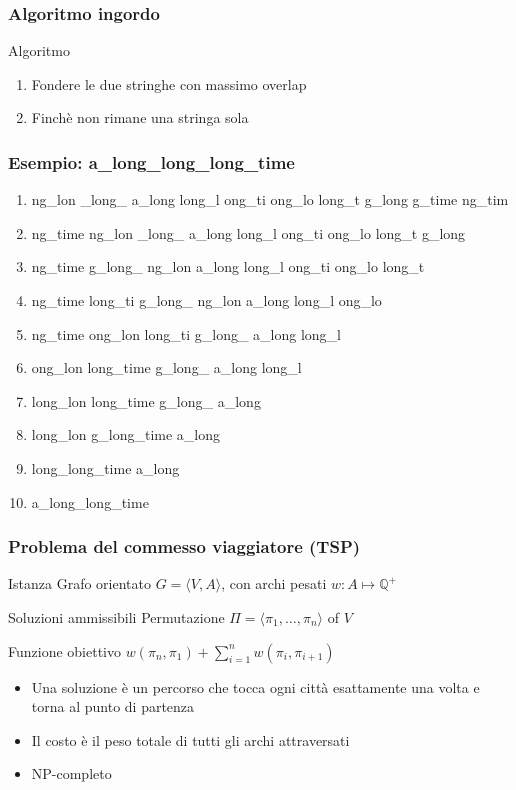 \begin{frame}[fragile]
\frametitle{Algoritmo ingordo}
\begin{block}{Algoritmo}
\begin{enumerate}
\item
Fondere le due stringhe con massimo overlap
\item
Finchè non rimane una stringa sola
\end{enumerate}
\end{block}
\end{frame}

\begin{frame}[fragile]
\frametitle{Esempio: a\_long\_long\_long\_time}
\begin{enumerate}
\item
ng\_lon \_long\_ a\_long long\_l ong\_ti ong\_lo long\_t g\_long
\alert{g\_time ng\_tim}
\item
  ng\_time ng\_lon
\alert{\_long\_}
 a\_long long\_l ong\_ti ong\_lo long\_t
\alert{g\_long}
\item
  ng\_time g\_long\_ ng\_lon a\_long long\_l
\alert{ong\_ti}
 ong\_lo
\alert{long\_t}
\item
  ng\_time long\_ti g\_long\_
\alert{ng\_lon}
 a\_long long\_l
\alert{ong\_lo}
\item
\alert{ng\_time}
 ong\_lon
\alert{long\_ti}
 g\_long\_ a\_long long\_l
\item
\alert{ong\_lon}
 long\_time g\_long\_ a\_long
long\_l\alert{}
\item
  long\_lon
\alert{long\_time g\_long\_}
 a\_long
\item
\alert{long\_lon g\_long\_time}
 a\_long
\item
\alert{long\_long\_time a\_long}
\item
  a\_long\_long\_time
  \end{enumerate}
  \end{frame}


\begin{frame}[fragile]
\frametitle{Problema del commesso viaggiatore (TSP)}
\begin{block}{Istanza}
Grafo orientato $G=\langle  V,A \rangle$, con archi pesati $w:A \mapsto \mathbb{Q}^{+}$
\end{block}
\begin{block}{Soluzioni ammissibili}
Permutazione $\Pi=\langle  \pi_{1}, \ldots,  \pi_{n} \rangle$ of $V$
\end{block}
\begin{block}{Funzione obiettivo}
$w(\pi_{n},\pi_{1}) + \sum_{i=1}^{n} w(\pi_{i},\pi_{i+1})$
\end{block}
\begin{itemize}
\item
Una soluzione è un percorso che tocca ogni città esattamente una volta e torna
al punto di partenza
\item
Il costo è il peso totale di tutti gli archi attraversati
\item
NP-completo
\end{itemize}
\end{frame}

